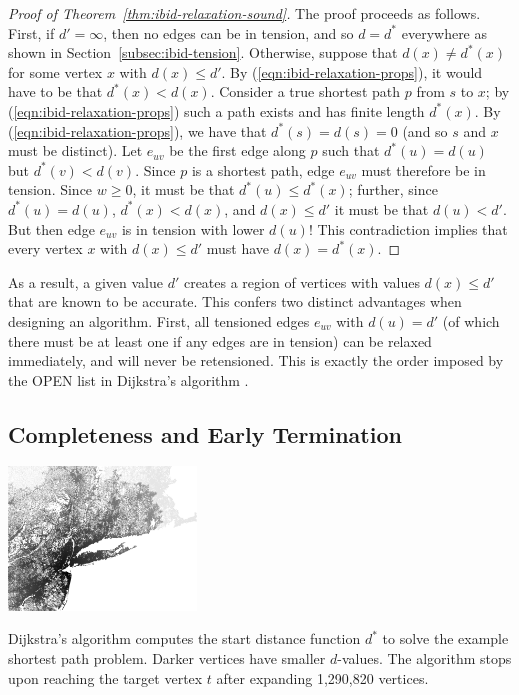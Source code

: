 \begin{proof}[Proof of Theorem~\ref{thm:ibid-relaxation-sound}]
The proof proceeds as follows.
First, if $d' = \infty$,
then no edges can be in tension,
and so $d = d^*$ everywhere
as shown in Section~\ref{subsec:ibid-tension}.
Otherwise,
suppose that $d(x) \neq d^*(x)$
for some vertex $x$ with $d(x) \leq d'$.
By (\ref{eqn:ibid-relaxation-props}),
it would have to be that $d^*(x) < d(x)$.
Consider a true shortest path $p$ from $s$ to $x$;
by (\ref{eqn:ibid-relaxation-props})
such a path exists and has finite length $d^*(x)$.
By (\ref{eqn:ibid-relaxation-props}),
we have that $d^*(s) = d(s) = 0$
(and so $s$ and $x$ must be distinct).
Let $e_{uv}$ be the first edge along $p$ such that
$d^*(u) = d(u)$
but $d^*(v) < d(v)$.
Since $p$ is a shortest path,
edge $e_{uv}$ must therefore be in tension.
Since $w \geq 0$,
it must be that $d^*(u) \leq d^*(x)$;
further, since $d^*(u) = d(u)$,
$d^*(x) < d(x)$,
and $d(x) \leq d'$
it must be that $d(u) < d'$.
But then edge $e_{uv}$ is in tension with lower $d(u)$!
This contradiction implies that every vertex $x$
with $d(x) \leq d'$
must have $d(x) = d^*(x)$.
\end{proof}

As a result,
a given value $d'$ creates a region of vertices
with values $d(x) \leq d'$ that are known to be
accurate.
This confers two distinct advantages when designing an algorithm.
First,
all tensioned edges $e_{uv}$ with $d(u) = d'$
(of which there must be at least one if any edges are in tension)
can be relaxed immediately,
and will never be retensioned.
This is exactly the order imposed by the OPEN list in Dijkstra's
algorithm \citep{dijkstra1959anote}.

\subsection{Completeness and Early Termination}
\label{subsec:ibid-dijkstra-completeness}

\begin{marginfigure}%
   \centering%
   \includegraphics[width=5cm]{figs/incbi-road-ne/singleshot/example-dijkstra.png}%
   \caption{Dijkstra's algorithm computes the start distance function
      $d^*$ to solve the example shortest path problem.
      Darker vertices have smaller $d$-values.
      The algorithm stops upon reaching the target vertex $t$
      after expanding 1,290,820 vertices.}%
   \label{fig:ibid:example-distance}%
\end{marginfigure}

